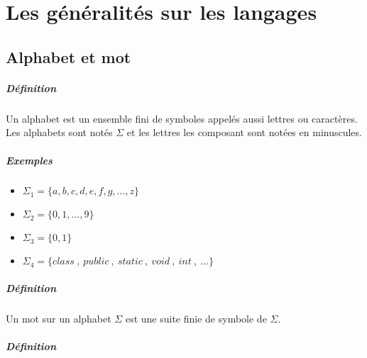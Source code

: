 \chapter{Les généralités sur les langages} %
\label{cha:les_g_n_ralit_s_sur_les_langages}


\section{Alphabet et mot} %
\label{sec:alphabet_et_mot}


\paragraph{Définition} %
\label{par:d_finition}

Un alphabet est un ensemble fini de symboles appelés aussi lettres ou caractères. Les alphabets sont notés $\Sigma$ et les lettres les composant sont notées en minuscules.



\paragraph{Exemples} %
\label{par:exemples}


\begin{itemize}
	\item $\Sigma_1 = \{a,b,c,d,e,f,g,\ldots,z\}$
	\item $\Sigma_2 = \{0,1,\ldots,9\}$
	\item $\Sigma_3 = \{0,1\}$
	\item $\Sigma_4 = \{class\ ,\ public\ ,\ static\ ,\ void\ ,\ int\ ,\ \ldots\}$
\end{itemize}




\paragraph{Définition} %
\label{par:d_finition}

Un mot sur un alphabet $\Sigma$ est une suite finie de symbole de $\Sigma$.



\paragraph{Définition} %
\label{par:d_finition}

